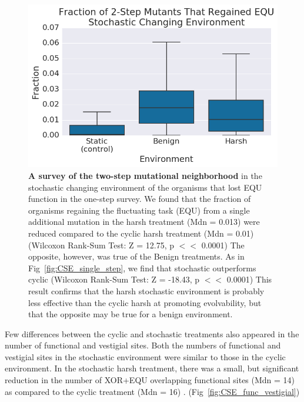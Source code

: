 \documentclass[PhD]{msu-thesis}
\begin{document}
	\begin{figure}[!h] %
	\includegraphics[trim={0.2cm 0 0.4cm 0.25cm},clip,width=0.75\columnwidth]{figures/CE/CSE_frac_2step__box.png}
	\caption{\textbf{A survey of the two-step mutational neighborhood} in the stochastic changing environment of the organisms that lost EQU function in the one-step survey. We found that the fraction of organisms regaining the fluctuating task (EQU) from a single additional mutation in the harsh treatment (Mdn = 0.013) were reduced compared to the cyclic harsh treatment (Mdn = 0.01) (Wilcoxon Rank-Sum Test: Z = 12.75, p $<<$ 0.0001) The opposite, however, was true of the Benign treatments. As in Fig~\ref{fig:CSE_single_step}, we find that stochastic outperforms cyclic (Wilcoxon Rank-Sum Test: Z = -18.43, p $<<$ 0.0001) This result confirms that the harsh stochastic environment is probably less effective than the cyclic harsh at promoting evolvability, but that the opposite may be true for a benign environment.
	}\label{fig:CSE_two_step}
	\end{figure}

Few differences between the cyclic and stochastic treatments also appeared in the number of functional and vestigial sites. Both the numbers of functional and vestigial sites in the stochastic environment were similar to those in the cyclic environment. In the stochastic harsh treatment, there was a small, but significant reduction in the number of XOR+EQU overlapping functional sites (Mdn = 14) as compared to the cyclic treatment (Mdn = 16) . (Fig~\ref{fig:CSE_func_vestigial}) 
\end{document}
